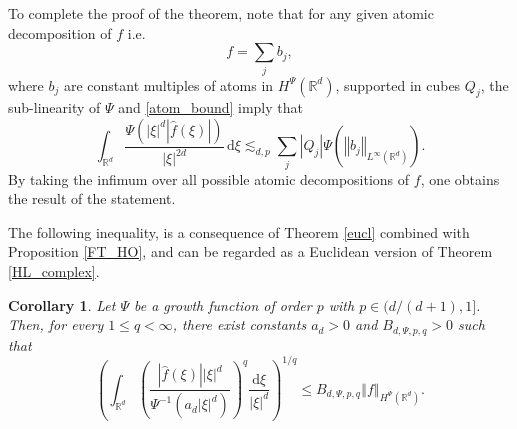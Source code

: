 \documentclass[a4paper, leqno, 10pt]{amsart}
\numberwithin{equation}{section}
\newtheorem{corollary}[thm]{Corollary}
\newcommand{\dd}{\mathrm{d}}
\newcommand{\R}{\mathbb{R}}
\newcommand{\norm}[1]{\left\Vert#1\right\Vert}
\newcommand{\brkt}[1]{\left(#1\right)}
\newcommand{\abs}[1]{\left|#1\right|}
\begin{document}
To complete the proof of the theorem, note that for any given atomic decomposition of $f$ i.e.
\[ 
f=\sum_j b_j, 
\]
where $b_j$ are constant multiples of atoms in $H^{\Psi} (\R^d)$, supported in cubes $Q_j$, the sub-linearity of $\Psi$ and \eqref{atom_bound} imply that 
\[
\int_{\R^d} \frac{ \Psi \brkt{\abs{\xi}^d\abs{\widehat{f}(\xi)}}}{\abs{\xi}^{2d}} \, \dd \xi\lesssim_{d,p} \sum_j  \abs{Q_j}\Psi \brkt{ \norm{b_j}_{L^{\infty} (\R^d)}} .
\]
By taking the infimum over all possible atomic decompositions of $f$, one obtains the result of the statement.
 
The following inequality, is a consequence of Theorem \ref{eucl} combined with Proposition \ref{FT_HO}, and can be regarded as a Euclidean version of Theorem \ref{HL_complex}. 

\begin{corollary}\label{cor}
Let $\Psi$ be a growth function of order $p$ with  $p \in ( d/(d+1), 1 ]$. Then, for every $1\leq q<\infty$, there exist constants $a_d >0$ and $B_{d, \Psi,p,q } > 0$ such that   
\[
\brkt{  \int_{\R^d} \brkt{ \frac{\abs{\widehat{f}(\xi)} \abs{\xi}^d }{ \Psi^{-1} \brkt{a_d \abs{\xi}^d }} }^q \frac{\dd \xi}{ \abs{\xi}^d} }^{1/q} \leq  B_{d, \Psi,p,q } \norm{f}_{H^{\Psi} (\R^d)}.
\]
\end{corollary}
\end{document}

